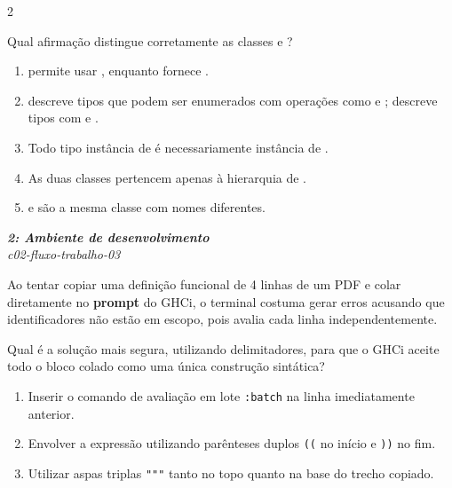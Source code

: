 \documentclass[a4paper,10pt,brazil]{article}
\begin{document}
\begin{multicols}{2}
\begin{flushright}
\end{flushright}
Qual afirmação distingue corretamente as classes  e ?
\begin{enumerate}
  \item {} permite usar , enquanto  fornece .
  \item {} descreve tipos que podem ser enumerados com operações como  e ;  descreve tipos com  e .
  \item Todo tipo instância de  é necessariamente instância de .
  \item As duas classes pertencem apenas à hierarquia de .
  \item {} e  são a mesma classe com nomes diferentes.

\end{enumerate}

\begin{flushright}
  \footnotesize
  \textit{\textbf{2: Ambiente de desenvolvimento}}\\
  \textit{c02-fluxo-trabalho-03}\\

\end{flushright}
Ao tentar copiar uma definição funcional de 4 linhas de um PDF e colar diretamente no \textbf{prompt} do GHCi, o terminal costuma gerar erros acusando que identificadores não estão em escopo, pois avalia cada linha independentemente. 

Qual é a solução mais segura, utilizando delimitadores, para que o GHCi aceite todo o bloco colado como uma única construção sintática?

\begin{enumerate}
  \item Inserir o comando de avaliação em lote \texttt{:batch} na linha imediatamente anterior.

  \item Envolver a expressão utilizando parênteses duplos \texttt{((} no início e \texttt{))} no fim.

  \item Utilizar aspas triplas \texttt{"""} tanto no topo quanto na base do trecho copiado.


\end{enumerate}
\end{multicols}
\end{document}
